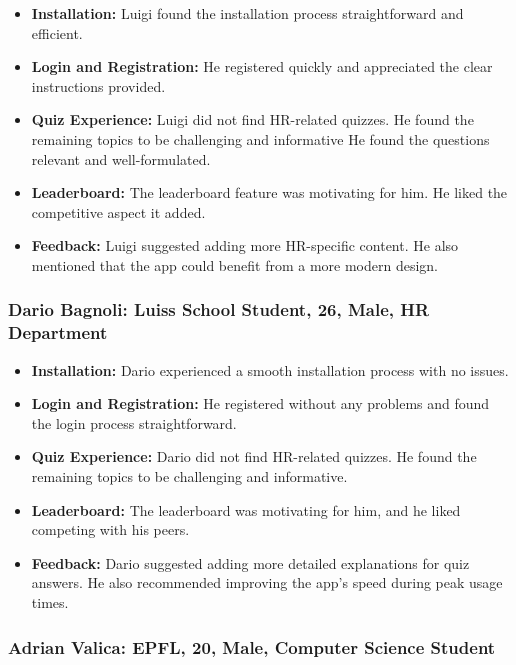 \begin{itemize}
    \item \textbf{Installation:} Luigi found the installation process straightforward and efficient.
    \item \textbf{Login and Registration:} He registered quickly and appreciated the clear instructions provided.
    \item \textbf{Quiz Experience:} Luigi did not find HR-related quizzes. He found the remaining topics to be challenging and informative He found the questions relevant and well-formulated.
    \item \textbf{Leaderboard:} The leaderboard feature was motivating for him. He liked the competitive aspect it added.
    \item \textbf{Feedback:} Luigi suggested adding more HR-specific content. He also mentioned that the app could benefit from a more modern design.
\end{itemize}

\subsubsection{Dario Bagnoli: Luiss School Student, 26, Male, HR Department}

\begin{itemize}
    \item \textbf{Installation:} Dario experienced a smooth installation process with no issues.
    \item \textbf{Login and Registration:} He registered without any problems and found the login process straightforward.
    \item \textbf{Quiz Experience:} Dario did not find HR-related quizzes. He found the remaining topics to be challenging and informative.
    \item \textbf{Leaderboard:} The leaderboard was motivating for him, and he liked competing with his peers.
    \item \textbf{Feedback:} Dario suggested adding more detailed explanations for quiz answers. He also recommended improving the app’s speed during peak usage times.
\end{itemize}

\subsubsection{Adrian Valica: EPFL, 20, Male, Computer Science Student}

